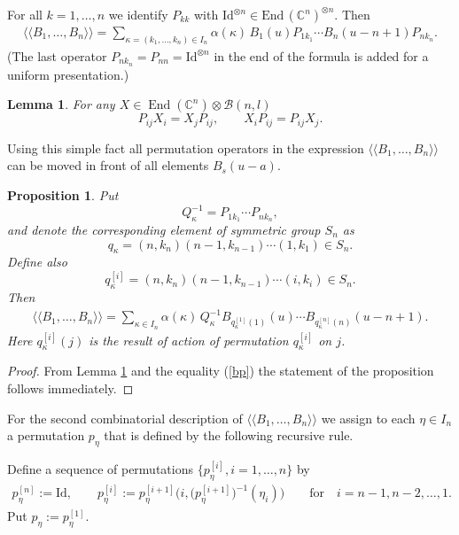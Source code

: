 \documentclass[11pt]{article}
\newtheorem{lemma}{Lemma}
\newtheorem{proposition}{Proposition}
\newcommand{\CC}{\mathbb C}    %
\newcommand{\B}{\mathcal B}
\begin{document}
For all $k=1,\dots, n$ we identify $P_{kk}$ with $\text{Id}^{\otimes n}\in \text{End}\, (\CC^n)^{\otimes n}$. Then
\begin{gather}\label{bp}
\langle \langle
B_1,\dots, B_n
\rangle \rangle =
 \sum _{\kappa=(k_1,\dots, k_n) \in I_n} \alpha(\kappa)\,B_1(u) P_{1k_1}
\cdots
B_{n}(u-n+1) P_{nk_n}.
\end{gather}
(The last operator $P_{n k_n}=P_{nn}=\text{Id}^{\otimes n}$ in the end of the formula  is  added  for a uniform presentation.)

\begin{lemma}\label{PXXP} For any $X\in \operatorname{End}( \CC^n) \otimes\B(n,l)$
\[
P_{ij}X_i=X_jP_{ij},
\qquad
X_iP_{ij}=P_{ij}X_j.
\]
\end{lemma}
Using this simple fact   all permutation operators  in the expression
$\langle \langle B_1,\dots, B_n\rangle \rangle $  can be moved in front of all elements $B_s(u-a)$.


\begin{proposition}\label{QA}
 Put
 \[
 Q^{-1}_{\kappa}=P_{1 k_1}\cdots P_{n k_n},
 \]
and denote the corresponding element of symmetric group $S_n$ as
\[
q_{\kappa}=(n,k_n)(n-1,k_{n-1})\cdots (1,k_1)\in S_n.
\]
Define also
\[
q_{\kappa}^{[i]}=(n,k_n)(n-1,k_{n-1})\cdots (i,k_i)\in S_n.
\]
Then
\begin{gather}\label{q2}
\langle \langle B_1,\dots, B_n\rangle \rangle
=\sum_{ \kappa \in I_n }\alpha{( \kappa)}\,Q^{-1}_{\kappa}B_{q_{\kappa}^{[1]}(1)}(u)\cdots B_{q_{\kappa}^{[n]}(n)}(u-n+1).
\end{gather}
Here $q_{\kappa}^{[i]}(j)$ is the result of action of permutation $q_{\kappa}^{[i]}$ on $j$.
\end{proposition}

\begin{proof}
From Lemma \ref{PXXP}  and the equality (\ref{bp}) the statement of the proposition  follows imme\-dia\-te\-ly.
\end{proof}


For the second  combinatorial description of $\langle \langle B_1,\dots, B_n\rangle \rangle $ we assign to  each $\eta\in I_n$ a permutation
 $p_\eta$ that is def\/ined by the following recursive rule.

  Def\/ine a sequence of permutations $\{p^{[i]}_\eta, i=1,\dots, n\}$ by
  \begin{gather*}%
    p^{[n]}_\eta :=\text{Id},\qquad
       p^{[i]}_\eta :=
       p^{[i+1]}_\eta \big(i,\big(p^{[i+1]}_\eta\big)^{-1}(\eta_i)\big)\qquad \text{for}\quad i=n-1, n-2,\dots, 1.
 \end{gather*}
Put $p_\eta:=p^{[1]}_\eta$.
\end{document}
